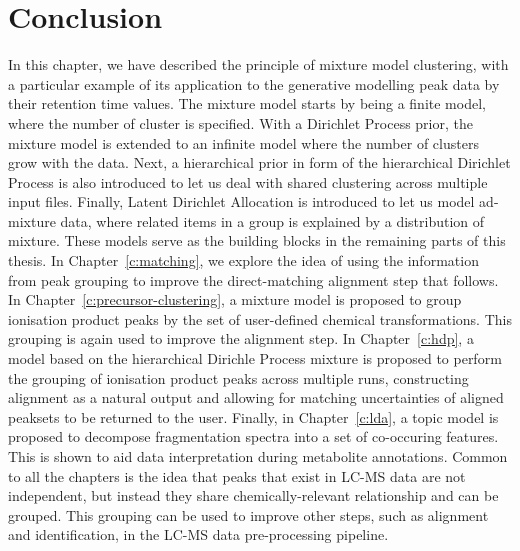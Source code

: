 \section{Conclusion}

In this chapter, we have described the principle of mixture model clustering, with a particular example of its application to the generative modelling peak data by their retention time values. The mixture model starts by being a finite model, where the number of cluster is specified. With a Dirichlet Process prior, the mixture model is extended to an infinite model where the number of clusters grow with the data. Next, a hierarchical prior in form of the hierarchical Dirichlet Process is also introduced to let us deal with shared clustering across multiple input files. Finally, Latent Dirichlet Allocation is introduced to let us model ad-mixture data, where related items in a group is explained by a distribution of mixture. These models serve as the building blocks in the remaining parts of this thesis. In Chapter~\ref{c:matching}, we explore the idea of using the information from peak grouping to improve the direct-matching alignment step that follows. In Chapter~\ref{c:precursor-clustering}, a mixture model is proposed to group ionisation product peaks by the set of user-defined chemical transformations. This grouping is again used to improve the alignment step. In Chapter~\ref{c:hdp}, a model based on the hierarchical Dirichle Process mixture is proposed to perform the grouping of ionisation product peaks across multiple runs, constructing alignment as a natural output and allowing for matching uncertainties of aligned peaksets to be returned to the user. Finally, in Chapter~\ref{c:lda}, a topic model is proposed to decompose fragmentation spectra into a set of co-occuring features. This is shown to aid data interpretation during metabolite annotations. Common to all the chapters is the idea that peaks that exist in LC-MS data are not independent, but instead they share chemically-relevant relationship and can be grouped. This grouping can be used to improve other steps, such as alignment and identification, in the LC-MS data pre-processing pipeline.